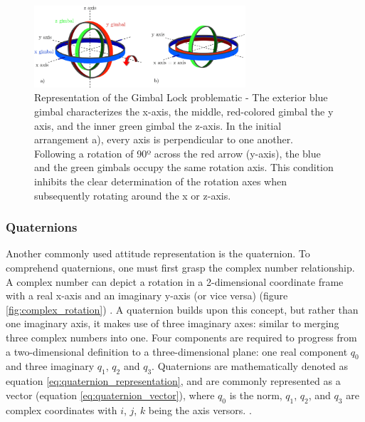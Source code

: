 \begin{figure}[!h]
    \centering
    \includegraphics[width=0.7\textwidth]{figures/gimbal_lock.png}
    \caption{Representation of the Gimbal Lock problematic \cite{zeitlhofler2019nominal} - The exterior blue gimbal characterizes the x-axis, the middle, red-colored gimbal the y axis, and the inner green gimbal the z-axis. In the initial arrangement a), every axis is perpendicular to one another. Following a rotation of 90º across the red arrow (y-axis), the blue and the green gimbals occupy the same rotation axis. This condition inhibits the clear determination of the rotation axes when subsequently rotating around the x or z-axis. }
    \label{fig:gimbal_lock}
\end{figure}

\subsubsection{Quaternions}

Another commonly used attitude representation is the quaternion. To comprehend quaternions, one must first grasp the complex number relationship. A complex number can depict a rotation in a 2-dimensional coordinate frame with a real x-axis and an imaginary y-axis (or vice versa) (figure \ref{fig:complex_rotation}) \cite{lee2008representing}. A quaternion builds upon this concept, but rather than one imaginary axis, it makes use of three imaginary axes: similar to merging three complex numbers into one. Four components are required to progress from a two-dimensional definition to a three-dimensional plane: one real component $q_0$ and three imaginary $q_1$, $q_2$ and $q_3$. Quaternions are mathematically denoted as equation \ref{eq:quaternion_representation}, and are commonly represented as a vector (equation \ref{eq:quaternion_vector}), where $q_0$ is the norm, $q_1$, $q_2$, and $q_3$ are complex coordinates with $i$, $j$, $k$ being the axis versors.  \cite{mukundan2002quaternions}.

